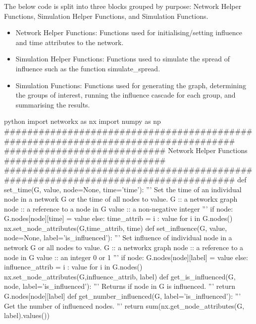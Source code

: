 \documentclass[10pt, oneside, reqno]{amsart}
\theoremstyle{plain}%
\theoremstyle{definition}
\theoremstyle{remark}
\begin{document}
The below code is split into three blocks grouped by purpose: Network Helper Functions, Simulation Helper Functions, and Simulation Functions.

\begin{itemize}
    \item Network Helper Functions: Functions used for initialising/setting influence and time attributes to the network.
    \item Simulation Helper Functions: Functions used to simulate the spread of influence such as the function simulate\_spread.
    \item Simulation Functions: Functions used for generating the graph, determining the groups of interest, running the influence cascade for each group, and summarising the results.
\end{itemize}


\newpage 
\begin{mintedbox}{python}
import networkx as nx
import numpy as np
###################################################################################
############################ Network Helper Functions  ############################
###################################################################################
def set_time(G, value, node=None, time='time'):
    '''
Set the time of an individual node in a network G or the time of all nodes to value.
        G      ::  a networkx graph
        node   ::  a reference to a node in G
        value  ::  a non-negative integer
    '''
    if node:
        G.nodes[node][time] = value
    else:
        time_attrib = {i : value for i in G.nodes()}
        nx.set_node_attributes(G,time_attrib, time)
def set_influence(G, value, node=None, label='is_influenced'):
    '''
Set influence of individual node in a network G or all nodes to value.
        G      ::  a networkx graph
        node   ::  a reference to a node in G
        value  ::  an integer 0 or 1
    '''
    if node:
        G.nodes[node][label] = value
    else:
        influence_attrib = { i : value for i in G.nodes() }
        nx.set_node_attributes(G,influence_attrib, label)
def get_is_influenced(G, node, label='is_influenced'):
    '''
        Returns if node in G is influenced.
    '''
    return G.nodes[node][label]
def get_number_influenced(G, label='is_influenced'):
    '''
        Get the number of influenced nodes.
    '''
    return sum(nx.get_node_attributes(G, label).values())
\end{mintedbox}
\end{document}
